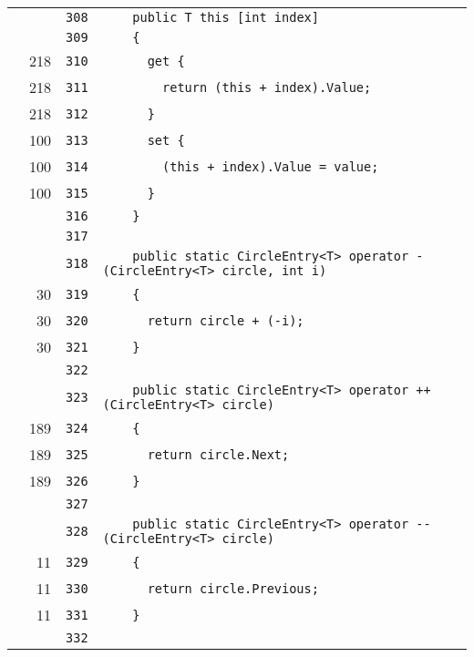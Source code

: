 \documentclass[a4paper,10pt]{article}
\begin{document}
\begin{longtable}[l]{lrrl}
\cellcolor{gray} &  & \verb~308~ & \verb~    public T this [int index]~\\
\cellcolor{gray} &  & \verb~309~ & \verb~    {~\\
\cellcolor{green} & 218 & \verb~310~ & \verb~      get {~\\
\cellcolor{green} & 218 & \verb~311~ & \verb~        return (this + index).Value;~\\
\cellcolor{green} & 218 & \verb~312~ & \verb~      }~\\
\cellcolor{green} & 100 & \verb~313~ & \verb~      set {~\\
\cellcolor{green} & 100 & \verb~314~ & \verb~        (this + index).Value = value;~\\
\cellcolor{green} & 100 & \verb~315~ & \verb~      }~\\
\cellcolor{gray} &  & \verb~316~ & \verb~    }~\\
\cellcolor{gray} &  & \verb~317~ & \verb~~\\
\cellcolor{gray} &  & \verb~318~ & \verb~    public static CircleEntry<T> operator - (CircleEntry<T> circle, int i)~\\
\cellcolor{green} & 30 & \verb~319~ & \verb~    {~\\
\cellcolor{green} & 30 & \verb~320~ & \verb~      return circle + (-i);~\\
\cellcolor{green} & 30 & \verb~321~ & \verb~    }~\\
\cellcolor{gray} &  & \verb~322~ & \verb~~\\
\cellcolor{gray} &  & \verb~323~ & \verb~    public static CircleEntry<T> operator ++ (CircleEntry<T> circle)~\\
\cellcolor{green} & 189 & \verb~324~ & \verb~    {~\\
\cellcolor{green} & 189 & \verb~325~ & \verb~      return circle.Next;~\\
\cellcolor{green} & 189 & \verb~326~ & \verb~    }~\\
\cellcolor{gray} &  & \verb~327~ & \verb~~\\
\cellcolor{gray} &  & \verb~328~ & \verb~    public static CircleEntry<T> operator -- (CircleEntry<T> circle)~\\
\cellcolor{green} & 11 & \verb~329~ & \verb~    {~\\
\cellcolor{green} & 11 & \verb~330~ & \verb~      return circle.Previous;~\\
\cellcolor{green} & 11 & \verb~331~ & \verb~    }~\\
\cellcolor{gray} &  & \verb~332~ & \verb~~\\

\end{longtable}
\end{document}
